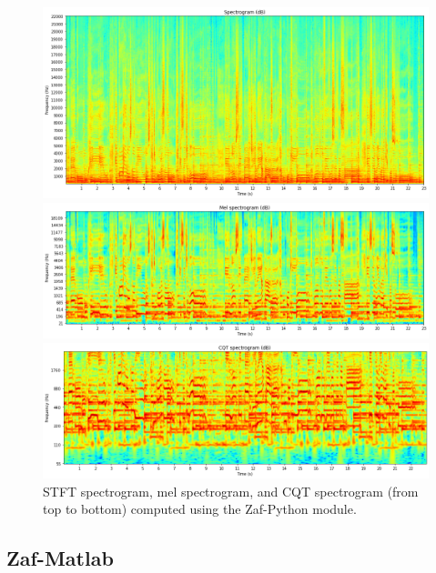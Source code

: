 \documentclass{article}
\begin{document}
\begin{figure}[!htb]
\centering
\begin{minipage}[b]{\columnwidth}
\includegraphics[width=\columnwidth]{Images/stft.png}
\end{minipage}
\begin{minipage}[b]{\columnwidth}
\includegraphics[width=\columnwidth]{Images/melspectrogram.png}
\end{minipage}
\begin{minipage}[b]{\columnwidth}
\includegraphics[width=\columnwidth]{Images/cqtspectrogram.png}
\end{minipage}
\caption{STFT spectrogram, mel spectrogram, and CQT spectrogram (from top to bottom) computed using the Zaf-Python module.}
\label{fig:zaf-python}
\end{figure}


\subsection{Zaf-Matlab}
\label{ssec:zaf-matlab}
\end{document}
